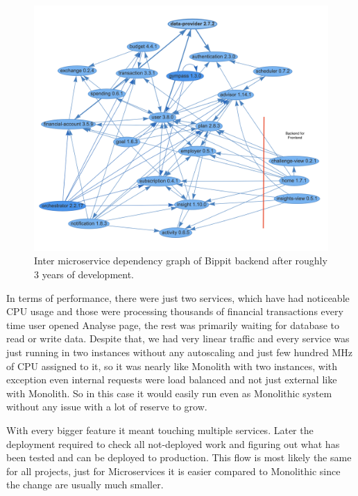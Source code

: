 \begin{figure}
    \centering
    \includegraphics[width=\textwidth]{images/microservices-current-commented.png}
    \caption{Inter microservice dependency graph of Bippit backend after roughly 3 years of development. \label{img:microservices-current-commented}}
\end{figure}

In terms of performance, there were just two services, which have had noticeable CPU usage and those were processing thousands of financial transactions every time user opened Analyse page, the rest was primarily waiting for database to read or write data. Despite that, we had very linear traffic and every service was just running in two instances without any autoscaling and just few hundred MHz of CPU assigned to it, so it was nearly like Monolith with two instances, with exception even internal requests were load balanced and not just external like with Monolith. So in this case it would easily run even as Monolithic system without any issue with a lot of reserve to grow.

With every bigger feature it meant touching multiple services. Later the deployment required to check all not-deployed work and figuring out what has been tested and can be deployed to production. This flow is most likely the same for all projects, just for Microservices it is easier compared to Monolithic since the change are usually much smaller.
